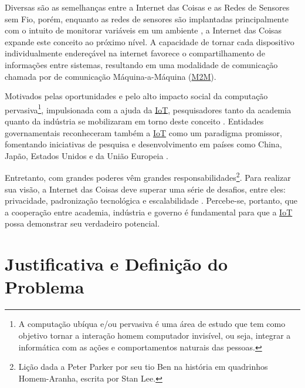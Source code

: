 \documentclass[twoside,english,brazilian]{UNISINOSmonografia}
\begin{document}
	Diversas são as semelhanças entre a Internet das Coisas e as Redes de 
	Sensores sem Fio, porém, enquanto as redes de sensores  
	são implantadas principalmente com o intuito de monitorar variáveis em um 
	ambiente \cite{Sakthidharan2012}, a Internet das Coisas expande este 
	conceito ao próximo nível. 
	A capacidade de tornar cada dispositivo individualmente endereçável na 
	internet favorece o compartilhamento de informações entre sistemas, 
	resultando em uma modalidade de comunicação chamada por
	 de comunicação Máquina-a-Máquina 
	(\hyperref[siglas]{M2M}).
	
	Motivados pelas oportunidades e pelo alto impacto social da computação 
	pervasiva\footnote{
A computação ubíqua e/ou pervasiva é uma área de estudo que tem como objetivo 
tornar a interação homem computador invisível, ou seja, integrar a informática 
com as ações e comportamentos naturais das pessoas.
}, impulsionada com a ajuda da \hyperref[siglas]{IoT}, pesquisadores tanto da 
	academia quanto da indústria se mobilizaram em torno deste conceito 
	\cite{Atzori2010b}. 
	Entidades governamentais reconheceram também a \hyperref[siglas]{IoT} como um paradigma 
	promissor, fomentando iniciativas de pesquisa e desenvolvimento em países 
	como China, Japão, Estados Unidos e da União Europeia 
	\cite{Sundmaeker2010}.
	
	Entretanto, com grandes poderes vêm grandes responsabilidades\footnote{
Lição dada a Peter Parker por seu tio Ben na história em 
quadrinhos Homem-Aranha, escrita por Stan Lee.
}. 
	Para realizar sua visão, a Internet das Coisas deve superar uma série de 
	desafios, entre eles: privacidade, padronização tecnológica e 
	escalabilidade \cite{Coetzee2011}. 
	Percebe-se, portanto, que a cooperação entre academia, indústria e governo é fundamental 
	para que a \hyperref[siglas]{IoT} possa demonstrar seu verdadeiro potencial.
	

\section{Justificativa e Definição do Problema}
\end{document}
